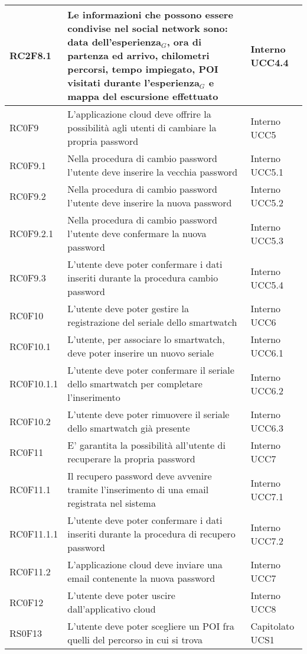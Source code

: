 \begin{center}
\begin{longtable}{|l|p{7cm}|p{1.7cm}|}
RC2F8.1		& Le informazioni che possono essere condivise nel social network sono: data dell'esperienza$_{G}$, ora di partenza ed arrivo, chilometri percorsi, tempo impiegato, POI visitati durante l'esperienza$_{G}$ e mappa del escursione effettuato & Interno UCC4.4 \\\hline
RC0F9		& L'applicazione cloud deve offrire la possibilità agli utenti di cambiare la propria password & Interno UCC5 \\\hline
RC0F9.1		& Nella procedura di cambio password l'utente deve inserire la vecchia password & Interno UCC5.1 \\\hline
RC0F9.2		& Nella procedura di cambio password l'utente deve inserire la nuova password & Interno UCC5.2 \\\hline
RC0F9.2.1	& Nella procedura di cambio password l'utente deve confermare la nuova password & Interno UCC5.3 \\\hline
RC0F9.3		& L'utente deve poter confermare i dati inseriti durante la procedura cambio password & Interno UCC5.4 \\\hline
RC0F10		& L'utente deve poter gestire la registrazione del seriale dello smartwatch & Interno UCC6 \\\hline
RC0F10.1	& L'utente, per associare lo smartwatch, deve poter inserire un nuovo seriale & Interno UCC6.1 \\\hline
RC0F10.1.1	& L'utente deve poter confermare il seriale dello smartwatch per completare l'inserimento & Interno UCC6.2 \\\hline
RC0F10.2	& L'utente deve poter rimuovere il seriale dello smartwatch già presente & Interno UCC6.3 \\\hline
RC0F11		& E' garantita la possibilità all'utente di recuperare la propria password & Interno UCC7 \\\hline
RC0F11.1	& Il recupero password deve avvenire tramite l'inserimento di una email registrata nel sistema & Interno UCC7.1 \\\hline
RC0F11.1.1	& L'utente deve poter confermare i dati inseriti durante la procedura di recupero password & Interno UCC7.2 \\\hline
RC0F11.2	& L'applicazione cloud deve inviare una email contenente la nuova password & Interno UCC7 \\\hline
RC0F12		& L'utente deve poter uscire dall'applicativo cloud & Interno UCC8 \\\hline
RS0F13		& L'utente deve poter scegliere un POI fra quelli del percorso in cui si trova & Capitolato UCS1\\\hline

\end{longtable}
\end{center}
